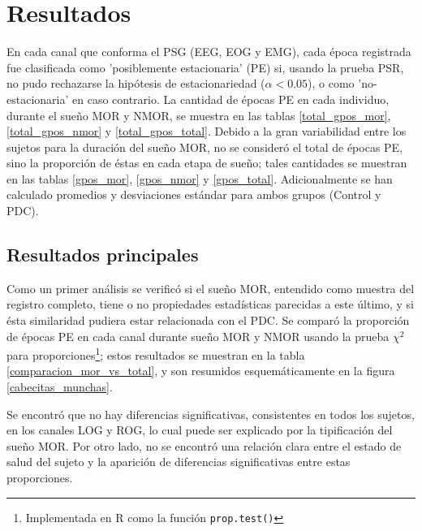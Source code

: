 
\chapter{Resultados}

En cada canal que conforma el PSG (EEG, EOG y EMG), cada \'epoca registrada fue clasificada como 
'posiblemente estacionaria' (PE) si, usando la prueba PSR, no pudo rechazarse la hip\'otesis de 
estacionariedad ($\alpha < 0.05$), o como 'no-estacionaria' en caso contrario.
La cantidad de \'epocas PE en cada individuo, durante el sue\~no MOR y NMOR, se muestra en las 
tablas \ref{total_gpos_mor}, \ref{total_gpos_nmor} y \ref{total_gpos_total}. Debido a la gran 
variabilidad entre los sujetos para la duraci\'on del sue\~no MOR, no se consider\'o el total de 
\'epocas PE, sino la proporci\'on de \'estas en cada etapa de sue\~no; tales cantidades se muestran 
en las tablas \ref{gpos_mor}, \ref{gpos_nmor} y \ref{gpos_total}. 
Adicionalmente se han calculado promedios y desviaciones est\'andar para ambos grupos (Control y 
PDC).

\section{Resultados principales}

Como un primer an\'alisis se verific\'o si el sue\~no MOR, entendido como muestra del registro
completo, tiene o no propiedades estad\'isticas parecidas a este \'ultimo, y si \'esta similaridad 
pudiera estar relacionada con el PDC. 
Se compar\'o la proporci\'on de \'epocas PE en cada canal durante sue\~no MOR y NMOR usando la 
prueba $\chi^{2}$ para proporciones\footnote{Implementada en R como la funci\'on 
\texttt{prop.test()}}; estos resultados se muestran en la tabla \ref{comparacion_mor_vs_total},
y son resumidos esquem\'aticamente en la figura \ref{cabecitas_munchas}.

Se encontr\'o que no hay diferencias significativas, consistentes en todos los sujetos, en los 
canales LOG y ROG, lo cual puede ser explicado por la tipificaci\'on del sue\~no MOR. 
Por otro lado, no se encontr\'o una relaci\'on clara entre el estado de salud del sujeto y la 
aparici\'on de diferencias significativas entre estas proporciones.

